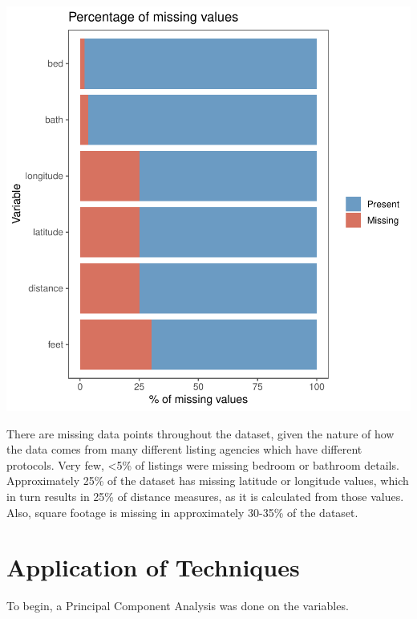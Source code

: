 \documentclass[11pt, a4paper]{article}
\begin{document}
\includegraphics{exploratory_analysis-005}

There are missing data points throughout the dataset, given the nature of how the data
comes from many different listing agencies which have different protocols. Very few, <5\% of listings were missing bedroom or bathroom details. Approximately 25\% of the dataset has missing latitude or longitude values, which in turn results in 25\% of distance measures, as it is calculated from those values. Also, square footage is missing in approximately 30-35\% of the dataset.

\pagebreak

\section{Application of Techniques}

To begin, a Principal Component Analysis was done on the variables.
\end{document}
